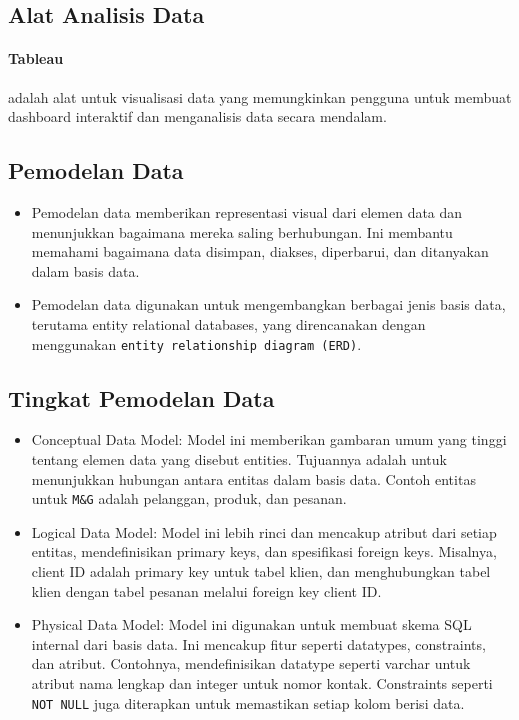 \documentclass{article}
\begin{document}
\subsection{Alat Analisis Data}
\paragraph{Tableau} adalah alat untuk visualisasi data yang memungkinkan pengguna untuk membuat dashboard interaktif dan menganalisis data secara mendalam.

\subsection{Pemodelan Data}
\begin{itemize}
    \item Pemodelan data memberikan representasi visual dari elemen data dan menunjukkan bagaimana mereka saling berhubungan. Ini membantu memahami bagaimana data disimpan, diakses, diperbarui, dan ditanyakan dalam basis data.
    \item Pemodelan data digunakan untuk mengembangkan berbagai jenis basis data, terutama entity relational databases, yang direncanakan dengan menggunakan \verb|entity relationship diagram (ERD)|.
\end{itemize}

\subsection{Tingkat Pemodelan Data}
\begin{itemize}
    \item Conceptual Data Model: Model ini memberikan gambaran umum yang tinggi tentang elemen data yang disebut entities. Tujuannya adalah untuk menunjukkan hubungan antara entitas dalam basis data. Contoh entitas untuk \verb|M&G| adalah pelanggan, produk, dan pesanan.
    \item Logical Data Model: Model ini lebih rinci dan mencakup atribut dari setiap entitas, mendefinisikan primary keys, dan spesifikasi foreign keys. Misalnya, client ID adalah primary key untuk tabel klien, dan menghubungkan tabel klien dengan tabel pesanan melalui foreign key client ID.
    \item Physical Data Model: Model ini digunakan untuk membuat skema SQL internal dari basis data. Ini mencakup fitur seperti datatypes, constraints, dan atribut. Contohnya, mendefinisikan datatype seperti varchar untuk atribut nama lengkap dan integer untuk nomor kontak. Constraints seperti \verb|NOT NULL| juga diterapkan untuk memastikan setiap kolom berisi data.
\end{itemize}
\end{document}
